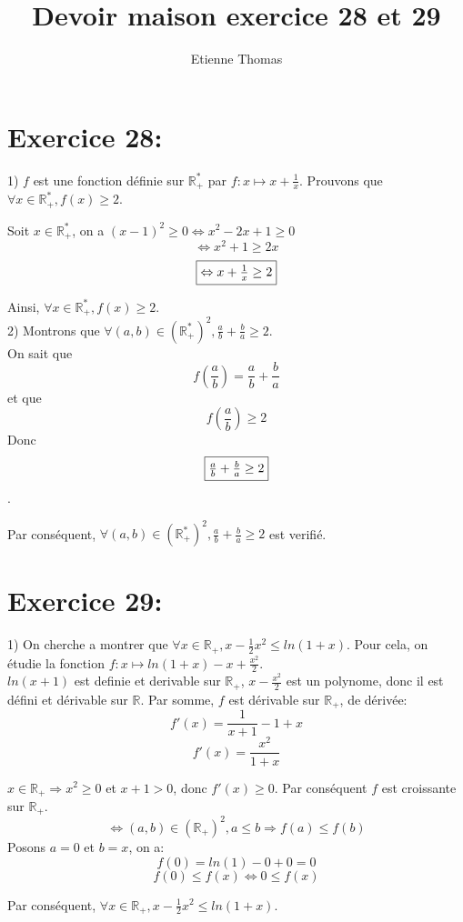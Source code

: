 \documentclass[11pt, letterpaper]{article}
\title{Devoir maison exercice 28 et 29}
\author{Etienne Thomas}
\begin{document}
\maketitle

\section*{Exercice 28:}

1) $f$ est une fonction définie sur $\mathbb{R}_{+}^{*}$ par $f : x \mapsto x + \frac{1}{x}$.
Prouvons que $\forall x \in \mathbb{R}_{+}^{*}, f(x) \geq 2$.

Soit $x \in \mathbb{R}_{+}^{*}$, on a $(x - 1)^2 \geq 0 \Leftrightarrow x^2 - 2x + 1 \geq 0$
\[\Leftrightarrow x^2 + 1 \geq 2x\]
\[\fbox{$\Leftrightarrow x + \frac{1}{x} \geq 2$}\]

Ainsi, $\forall x \in \mathbb{R}_{+}^{*}, f(x) \geq 2$.
\\
2) Montrons que $\forall (a, b) \in (\mathbb{R}_{+}^{*})^2, \frac{a}{b} + \frac{b}{a} \geq 2$.\\
On sait que 
\[ f(\frac{a}{b}) = \frac{a}{b} + \frac{b}{a} \]
et que \[f(\frac{a}{b}) \geq 2\]
Donc \[\fbox{$\frac{a}{b} + \frac{b}{a} \geq 2$}\].

Par conséquent, $\forall (a, b) \in (\mathbb{R}_{+}^{*})^2, \frac{a}{b} + \frac{b}{a} \geq 2$ est verifié.

\section*{Exercice 29:}

1) On cherche a montrer que $\forall x \in \mathbb{R}_{+}, x - \frac{1}{2}x^2 \leq ln(1 + x)$.
Pour cela, on étudie la fonction $f : x \mapsto ln(1 + x) - x + \frac{x^2}{2}$.\\
$ln(x + 1)$ est definie et derivable sur $\mathbb{R}_{+}$, $x - \frac{x^2}{2}$ est un polynome,
donc il est défini et dérivable sur $\mathbb{R}$.
Par somme, $f$ est dérivable sur $\mathbb{R}_{+}$, de dérivée:
\[f'(x) = \frac{1}{x + 1} - 1 + x\]
\[f'(x) = \frac{x^2}{1 + x}\]

$x \in \mathbb{R}_{+} \Rightarrow x^2 \geq 0$ et $ x + 1 > 0$, donc $f'(x) \geq 0$.
Par conséquent $f$ est croissante sur $\mathbb{R}_{+}$.\\
\[\Leftrightarrow (a, b) \in (\mathbb{R}_{+})^2, a \leq b \Rightarrow f(a) \leq f(b)\]
Posons $a = 0$ et $b = x$, on a: \[f(0) = ln(1) - 0 + 0 = 0\]
\[f(0) \leq f(x) \Leftrightarrow 0 \leq f(x)  \]

Par conséquent, $\forall x \in \mathbb{R}_{+}, x - \frac{1}{2}x^2 \leq ln(1 + x)$.
\end{document}
